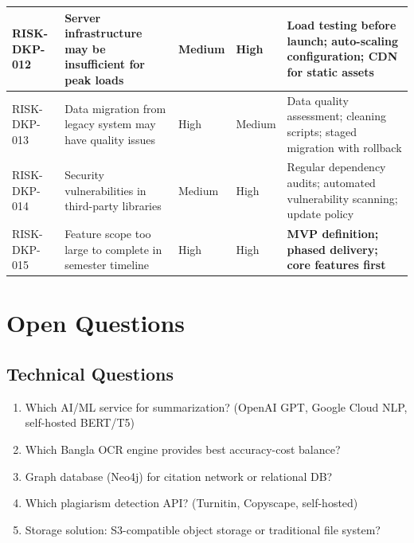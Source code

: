 \documentclass[12pt,a4paper]{report}
\begin{document}
\begin{longtable}{|p{2cm}|p{4.5cm}|p{1.5cm}|p{1.5cm}|p{4cm}|}
RISK-DKP-012 & Server infrastructure may be insufficient for peak loads & Medium & High & Load testing before launch; auto-scaling configuration; CDN for static assets \\ \hline
RISK-DKP-013 & Data migration from legacy system may have quality issues & High & Medium & Data quality assessment; cleaning scripts; staged migration with rollback \\ \hline
RISK-DKP-014 & Security vulnerabilities in third-party libraries & Medium & High & Regular dependency audits; automated vulnerability scanning; update policy \\ \hline
RISK-DKP-015 & Feature scope too large to complete in semester timeline & High & High & \textbf{MVP definition; phased delivery; core features first} \\ \hline
\end{longtable}

\section{Open Questions}

\subsection{Technical Questions}
\begin{enumerate}
    \item Which AI/ML service for summarization? (OpenAI GPT, Google Cloud NLP, self-hosted BERT/T5)
    \item Which Bangla OCR engine provides best accuracy-cost balance?
    \item Graph database (Neo4j) for citation network or relational DB?
    \item Which plagiarism detection API? (Turnitin, Copyscape, self-hosted)
    \item Storage solution: S3-compatible object storage or traditional file system?
\end{enumerate}
\end{document}
